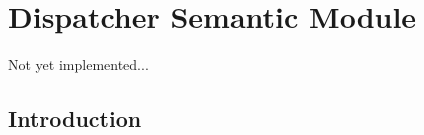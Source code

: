 \chapter{Dispatcher Semantic Module}

\begin{implnote}
Not yet implemented...
\end{implnote}


\section{Introduction}

\section{}

\section{}
